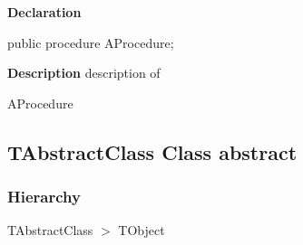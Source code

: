 \documentclass{report}
\newif\ifpdf
\begin{document}
\label{ok_abstract_sealed.TOrdinaryClass-AProcedure}
\begin{list}{}{
\setlength{\itemindent}{0cm}
\setlength{\listparindent}{0cm}
\setlength{\leftmargin}{\evensidemargin}
\addtolength{\leftmargin}{\tmplength}
\settowidth{\labelsep}{X}
\addtolength{\leftmargin}{\labelsep}
\setlength{\labelwidth}{\tmplength}
}
\item[\textbf{Declaration}\hfill]
\ifpdf
\begin{flushleft}
\fi
\begin{ttfamily}
public procedure AProcedure;\end{ttfamily}

\ifpdf
\end{flushleft}
\fi

\par
\item[\textbf{Description}]
description of \begin{ttfamily}AProcedure\end{ttfamily}

\end{list}
\ifpdf
\subsection*{\large{\textbf{TAbstractClass Class abstract}}\normalsize\hspace{1ex}\hrulefill}
\else
\subsection*{TAbstractClass Class abstract}
\fi
\label{ok_abstract_sealed.TAbstractClass}
\subsubsection*{\large{\textbf{Hierarchy}}\normalsize\hspace{1ex}\hfill}
TAbstractClass {$>$} TObject
\end{document}
